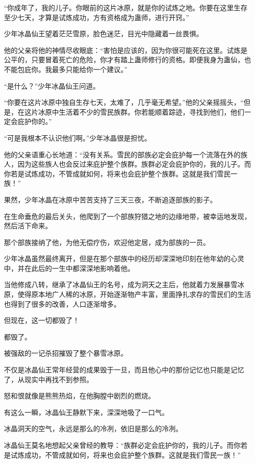 \begin{this_body}
“你成年了，我的儿子。你眼前的这片冰原，就是你的试炼之地。你要在这里生存至少七天，才算是试炼成功，方有资格成为蛊师，进行开窍。”

少年冰晶仙王望着茫茫雪原，脸色迷茫，目光中隐藏着一丝畏惧。

他的父亲将他的神情尽收眼底：“害怕是应该的，因为你很可能死在这里。试炼是公平的，只要冒着死亡的危险，你才有踏上蛊师修行的资格。即便我身为蛊仙，也不能包庇你。我最多只能给你一个建议。”

“是什么？”少年冰晶仙王问道。

“你要在这片冰原中独自生存七天，太难了，几乎毫无希望。”他的父亲摇摇头，“但是，在这片冰原中生活着不少的雪民族群。你若能顺着踪迹，寻找到他们，他们一定会庇护你的。”

“可是我根本不认识他们啊。”少年冰晶很是担忧。

他的父亲语重心长地道：“没有关系。雪民的部族必定会庇护每一个流落在外的族人，因为这些族人也会反过来庇护整个族群。族群必定会庇护你的，我的儿子。而你若是试炼成功，不管成就如何，将来也会庇护整个族群。这就是我们雪民一族！”

果然，少年冰晶在冰原中苦苦支持了三天三夜，不断追逐部族的影子。

在生命垂危的最后关头，他爬到了一个部族狩猎之地的边缘地带，被幸运地发现，然后活下命来。

那个部族接纳了他，为他无偿疗伤，欢迎他定居，成为部族的一员。

少年冰晶虽然最终离开，但是在那个部族中的经历却深深地印刻在他年幼的心灵中，并在此后的一生中都深深地影响着他。

当他修成八转，继承了冰晶仙王的名号，成为洞天之主后，他就着力发展暴雪冰原，使得原本地广人稀的冰原，开始逐渐物产丰富，里面挣扎求存的雪民们的生活也得到了很多的改善，人口逐渐增多。

但现在，这一切都毁了！

都毁了。

被强敌的一记杀招摧毁了整个暴雪冰原。

不仅是冰晶仙王常年经营的成果毁于一旦，而且他心中的那份记忆也只能是记忆了，从现实中再找不到参照。

怒和恨就像是熊熊热焰，在他胸膛中剧烈的燃烧。

有这么一瞬，冰晶仙王静默下来，深深地吸了一口气。

冰晶洞天的空气，永远是那么的冷冽，依旧是那么的冷冽。

冰晶仙王莫名地想起父亲曾经的教导：“族群必定会庇护你的，我的儿子。而你若是试炼成功，不管成就如何，将来也会庇护整个族群。这就是我们雪民一族！”


\end{this_body}
